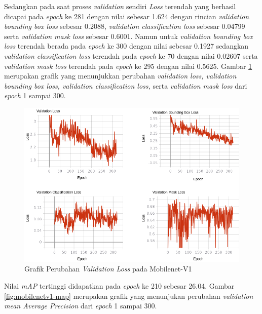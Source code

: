 Sedangkan pada saat proses \textit{validation} sendiri \textit{Loss} terendah yang berhasil dicapai pada \textit{epoch} ke 281 dengan nilai sebesar 1.624 dengan rincian \textit{validation bounding box loss} sebesar 0.2088, \textit{validation classification loss} sebesar 0.04799 serta \textit{validation mask loss} sebesar 0.6001. Namun untuk \textit{validation bounding box loss} terendah berada pada \textit{epoch} ke 300 dengan nilai sebesar 0.1927 sedangkan \textit{validation classification loss} terendah pada \textit{epoch} ke 70 dengan nilai 0.02607 serta \textit{validation mask loss} terendah pada \textit{epoch} ke 295 dengan nilai 0.5625. Gambar \ref{fig:mobilenetv1-val} merupakan grafik yang menunjukkan perubahan \textit{validation loss, validation bounding box loss, validation classification loss,} serta \textit{validation mask loss} dari \textit{epoch} 1 sampai 300.

\begin{figure}[h]
	\centering
	\includegraphics[scale=0.36]{gambar/mobilenetv1-val.png}
	\caption{Grafik Perubahan \textit{Validation Loss} pada Mobilenet-V1}
	\label{fig:mobilenetv1-val}
\end{figure}

Nilai \textit{mAP} tertinggi didapatkan pada \textit{epoch} ke 210 sebesar 26.04. Gambar \ref{fig:mobilenetv1-map} merupakan grafik yang menunjukan perubahan \textit{validation mean Average Precision} dari \textit{epoch} 1 sampai 300.

\newpage

